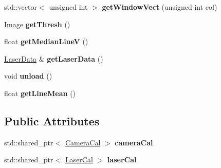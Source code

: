 \begin{DoxyCompactItemize}
\item 
std\+::vector$<$ unsigned int $>$ {\bfseries get\+Window\+Vect} (unsigned int col)\hypertarget{classLaserLoadImage_a5baa426e2a545cd10ecacd015658ac7b}{}\label{classLaserLoadImage_a5baa426e2a545cd10ecacd015658ac7b}

\item 
\hyperlink{classImage}{Image} {\bfseries get\+Thresh} ()\hypertarget{classLaserLoadImage_ac7e693fde607c976c0082ac8630909e7}{}\label{classLaserLoadImage_ac7e693fde607c976c0082ac8630909e7}

\item 
float {\bfseries get\+Median\+LineV} ()\hypertarget{classLaserLoadImage_af59c73a542cba2dcf79b9b434d2ef732}{}\label{classLaserLoadImage_af59c73a542cba2dcf79b9b434d2ef732}

\item 
\hyperlink{classLaserData}{Laser\+Data} \& {\bfseries get\+Laser\+Data} ()\hypertarget{classLaserLoadImage_a1f674f7012f2709fa33192f7650cbf97}{}\label{classLaserLoadImage_a1f674f7012f2709fa33192f7650cbf97}

\item 
void {\bfseries unload} ()\hypertarget{classLaserLoadImage_a795a35b98cab62422739efe6eb4d2fa5}{}\label{classLaserLoadImage_a795a35b98cab62422739efe6eb4d2fa5}

\item 
float {\bfseries get\+Line\+Mean} ()\hypertarget{classLaserLoadImage_ab854e861fb3c5bdd148a8b4a3c61a1af}{}\label{classLaserLoadImage_ab854e861fb3c5bdd148a8b4a3c61a1af}

\end{DoxyCompactItemize}
\subsection*{Public Attributes}
\begin{DoxyCompactItemize}
\item 
std\+::shared\+\_\+ptr$<$ \hyperlink{classCameraCal}{Camera\+Cal} $>$ {\bfseries camera\+Cal}\hypertarget{classLaserLoadImage_a2727aa8348ef7f6c9ae3ace78ddd3219}{}\label{classLaserLoadImage_a2727aa8348ef7f6c9ae3ace78ddd3219}

\item 
std\+::shared\+\_\+ptr$<$ \hyperlink{classLaserCal}{Laser\+Cal} $>$ {\bfseries laser\+Cal}\hypertarget{classLaserLoadImage_a3d0120ef420c233eed3ef72436981164}{}\label{classLaserLoadImage_a3d0120ef420c233eed3ef72436981164}

\end{DoxyCompactItemize}
